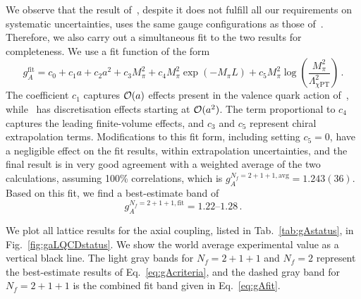 We observe that the result of~\cite{Berkowitz:2017gql}, despite it does
not fulfill all our requirements on systematic uncertainties, uses the same 
gauge configurations as those of~\cite{Bhattacharya:2016zcn}.
%
Therefore, we also carry out a simultaneous fit to the two results for
completeness.
%
We use a fit function of the form
\begin{equation}
g_A^{\mathrm{fit}} 
= 
c_0 + 
c_1a + 
c_2a^2 + 
c_3M_\pi^2 + 
c_4M_\pi^2 \exp(-M_\pi L) +
c_5M_\pi^2 \log\left(\frac{M_\pi^2}{\Lambda_{\chi \mathrm{PT}}^2}\right)\,.
\end{equation}
%
The coefficient $c_1$ captures ${\cal O}(a)$ effects present in the valence 
quark action of~\cite{Bhattacharya:2016zcn}, while~\cite{Berkowitz:2017gql} 
has discretisation effects starting at ${\cal O}(a^2)$. 
%
The term proportional to $c_4$ captures the leading finite-volume effects, and 
$c_3$ and $c_5$ represent chiral extrapolation terms. 
%
Modifications to this fit form, including  setting $c_5=0$, have a negligible 
effect on the fit results, within extrapolation uncertainties, and the final 
result is in very good agreement with a weighted average of the two 
calculations, assuming 100\% correlations, which is 
$g_A^{N_f=2+1+1,\mathrm{avg}} = 1.243(36)$. 
%
Based on this fit, we find a best-estimate band of
\begin{equation}\label{eq:gAfit}
g_A^{N_f=2+1+1,\mathrm{fit}} = \numrange{1.22}{1.28}\,.
\end{equation}

We plot all lattice results for the axial coupling, listed in 
Tab.~\ref{tab:gAstatus}, in Fig.~\ref{fig:gaLQCDstatus}. 
%
We show the world average experimental value as a vertical black line. 
%
The light gray bands for $N_f=2+1+1$ and $N_f=2$ represent the best-estimate 
results of Eq.~\eqref{eq:gAcriteria}, and the dashed gray band for
$N_f=2+1+1$ is the combined fit band given in Eq.~\eqref{eq:gAfit}. 

